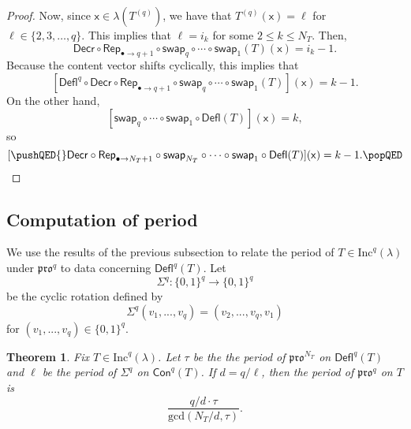 \documentclass[12pt]{amsart}
\newcommand{\x}{\ensuremath{\mathsf{x}}}
\newtheorem{theorem}{Theorem}[section]
\theoremstyle{definition}
\theoremstyle{remark}
\numberwithin{equation}{section}
\newcommand{\inc}{\ensuremath{\mathrm{Inc}}}
\newcommand{\pro}{\mathfrak{pro}}
\newcommand{\swap}{\ensuremath{\mathsf{swap}}}
\newcommand{\decr}{\ensuremath{\mathsf{Decr}}}
\newcommand{\rep}{\ensuremath{\mathsf{Rep}}}
\newcommand{\deflate}{\ensuremath{\mathsf{Defl}}}
\newcommand{\content}{\ensuremath{\mathsf{Con}}}
\begin{document}
\begin{proof}
Now, since $\x \in \lambda(T^{(q)})$, we have that $T^{(q)}(\x) = \ell$ for $\ell \in \{2,3,\dots,q\}$. This implies that $\ell = i_k$ for some $2 \leq k \leq N_T$. Then, 
\[
\decr \circ \rep_{\bullet \to q+1} \circ \swap_q \circ \cdots \circ \swap_1 (T)(\x) = i_k-1.
\]
Because the content vector shifts cyclically, this implies that 
 \[
 [\deflate^q \circ \decr \circ \rep_{\bullet \rightarrow q+1} \circ \swap_q \circ \cdots \circ \swap_1 (T)](\x) = k-1.
 \]
  On the other hand, 
  \[
  [\swap_q \circ \cdots \circ \swap_1 \circ \deflate(T)](\x) = k,
  \]
   so 
   \[
   [ \pushQED{\qed} \decr \circ \rep_{\bullet \rightarrow N_T + 1} \circ \swap_{N_T} \circ \cdots \circ \swap_1 \circ  \deflate(T)](\x) = k-1. \qedhere \popQED \] \let\qed\relax
\end{proof}

\subsection{Computation of period}\label{sec:period} We use the results of the previous subsection to relate the period of $T \in \inc^q(\lambda)$ under $\pro^q$ to data concerning $\deflate^q(T)$. Let 
\[\Sigma^q: \lbrace 0,1\rbrace^q \rightarrow \lbrace 0,1\rbrace^q\]
 be the cyclic rotation defined by 
 \[
 \Sigma^q(v_1,...,v_q) = (v_2,...,v_q,v_1)
 \]
  for $(v_1,...,v_q) \in \lbrace 0,1 \rbrace^q$. 
  
\begin{theorem}\label{thm:periodthm}
Fix $T \in \inc^q(\lambda)$. Let $\tau$ be the the period of $\pro^{N_T}$ on $\deflate^q(T)$ and $\ell$ be the period of $\Sigma^q$ on $\content^q(T)$. If $d = q/\ell$, then the period of $\pro^q$ on $T$ is \[\frac{q/d \cdot \tau}{\mathrm{gcd}(N_T/d,\tau)}. \]
\end{theorem} 
    
\end{document}
